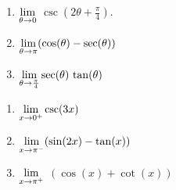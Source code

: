 \begin{multicols}{3}
\begin{enumerate}
\setcounter{enumi}{\value{HW}}

\item  $\displaystyle{\lim_{\theta \rightarrow 0}}$ $\csc\left(2\theta + \frac{\pi}{4}\right)$.

\item $\displaystyle{\lim_{\theta \rightarrow \pi} (\cos(\theta)  -  \sec(\theta))}$

\item $\displaystyle{\lim_{\theta \rightarrow \frac{\pi}{4}} \sec(\theta) \, \tan(\theta)}$

\setcounter{HW}{\value{enumi}}
\end{enumerate}
\end{multicols}

\begin{multicols}{3}
\begin{enumerate}
\setcounter{enumi}{\value{HW}}

\item  $\displaystyle{\lim_{x \rightarrow 0^{+}} \csc(3x)}$

\item $\displaystyle{\lim_{x \rightarrow \pi^{-}}  (\sin(2x)  - \tan(x))}$

\item\label{othertriglimitexlast} $\displaystyle{\lim_{x \rightarrow \pi^{+}}}$ $(\cos(x) + \cot(x))$

\setcounter{HW}{\value{enumi}}
\end{enumerate}
\end{multicols}


